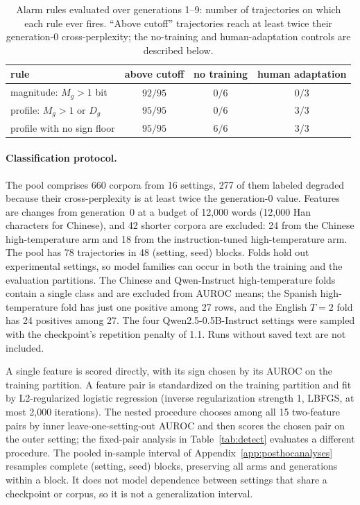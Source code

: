 \documentclass[10pt]{article}
\theoremstyle{plain}
\theoremstyle{definition}
\begin{document}
\begin{table}[ht]
\centering\small
\caption{Alarm rules evaluated over generations 1--9: number of trajectories on which each rule
ever fires. ``Above cutoff'' trajectories reach at least twice their generation-0
cross-perplexity; the no-training and human-adaptation controls are described below.}
\label{tab:alarms}
\begin{tabular}{lccc}
\toprule
rule & above cutoff & no training & human adaptation \\
\midrule
magnitude: $M_g>1$ bit & $92/95$ & $0/6$ & $0/3$ \\
profile: $M_g>1$ or $D_g$ & $95/95$ & $0/6$ & $3/3$ \\
profile with no sign floor & $95/95$ & $6/6$ & $3/3$ \\
\bottomrule
\end{tabular}
\end{table}

\paragraph{Classification protocol.} The pool comprises 660 corpora from 16 settings, 277 of
them labeled degraded because their cross-perplexity is at least twice the generation-0 value.
Features are changes from generation~0 at a budget of 12,000 words (12,000 Han characters
for Chinese), and 42 shorter corpora are excluded: 24 from the Chinese high-temperature arm and 18 from the instruction-tuned
high-temperature arm. The pool has 78 trajectories in 48 (setting, seed) blocks. Folds hold out
experimental settings, so model families can occur in both the training and the evaluation
partitions. The Chinese and Qwen-Instruct high-temperature folds contain a single class
and are excluded from AUROC means;
the Spanish high-temperature fold has just one positive among 27 rows, and the English $T=2$ fold
has 24 positives among 27. The four Qwen2.5-0.5B-Instruct settings were sampled with the
checkpoint's repetition penalty of 1.1. Runs without saved text are not included.

A single feature is scored directly, with its sign chosen by its AUROC on the training partition.
A feature pair is standardized on the training partition and fit by L2-regularized logistic
regression (inverse regularization strength 1, LBFGS, at most 2,000 iterations). The nested
procedure chooses among all 15 two-feature pairs by inner leave-one-setting-out AUROC and then
scores the chosen pair on the outer setting; the fixed-pair analysis in Table~\ref{tab:detect}
evaluates a different procedure. The pooled in-sample interval of Appendix~\ref{app:posthocanalyses} resamples
complete (setting, seed) blocks, preserving all arms and generations within a block. It does not
model dependence between settings that share a checkpoint or corpus, so it is not a generalization
interval.
\end{document}
